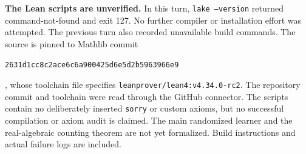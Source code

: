 \textbf{The Lean scripts are unverified.} In this turn, \texttt{lake --version} returned command-not-found and exit 127. No further compiler or installation effort was attempted. The previous turn also recorded unavailable build commands. The source is pinned to Mathlib commit \begin{center}\small\texttt{2631d1cc8c2ace6c6a900425d6e5d2b5963966e9}\end{center}, whose toolchain file specifies {\small\texttt{leanprover/lean4:v4.34.0-rc2}}. The repository commit and toolchain were read through the GitHub connector. The scripts contain no deliberately inserted \texttt{sorry} or custom axioms, but no successful compilation or axiom audit is claimed. The main randomized learner and the real-algebraic counting theorem are not yet formalized. Build instructions and actual failure logs are included.

